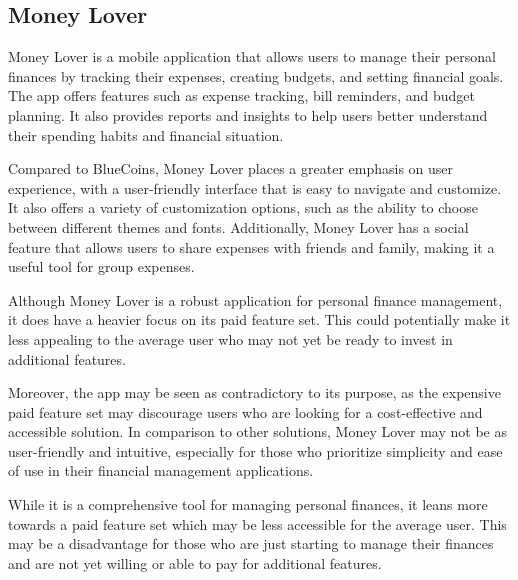 \newpage
\subsection{Money Lover}
\hspace{\parindent}Money Lover is a mobile application that allows users to manage their personal finances by tracking their expenses, creating budgets, and setting financial goals. The app offers features such as expense tracking, bill reminders, and budget planning. It also provides reports and insights to help users better understand their spending habits and financial situation.

\hspace{\parindent}Compared to BlueCoins, Money Lover places a greater emphasis on user experience, with a user-friendly interface that is easy to navigate and customize. It also offers a variety of customization options, such as the ability to choose between different themes and fonts. Additionally, Money Lover has a social feature that allows users to share expenses with friends and family, making it a useful tool for group expenses.

\hspace{\parindent}Although Money Lover is a robust application for personal finance management, it does have a heavier focus on its paid feature set. This could potentially make it less appealing to the average user who may not yet be ready to invest in additional features. 

\hspace{\parindent}Moreover, the app may be seen as contradictory to its purpose, as the expensive paid feature set may discourage users who are looking for a cost-effective and accessible solution. In comparison to other solutions, Money Lover may not be as user-friendly and intuitive, especially for those who prioritize simplicity and ease of use in their financial management applications.

\hspace{\parindent}While it is a comprehensive tool for managing personal finances, it leans more towards a paid feature set which may be less accessible for the average user. This may be a disadvantage for those who are just starting to manage their finances and are not yet willing or able to pay for additional features.

